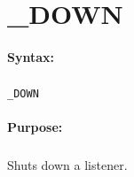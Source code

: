 
\newpage
\section{\_DOWN}
\label{cmd:_DOWN}

\paragraph{Syntax:}
\subparagraph{}
\texttt{\_DOWN}

\paragraph{Purpose:}
\subparagraph{}
Shuts down a listener.
